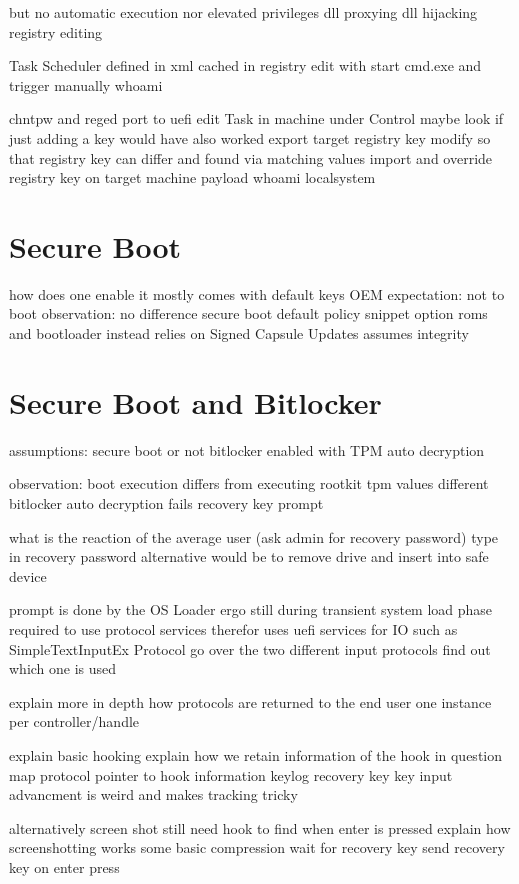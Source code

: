 but no automatic execution nor elevated privileges
dll proxying
dll hijacking
registry editing

Task Scheduler
defined in xml
cached in registry
edit with start cmd.exe and trigger manually
whoami

chntpw and reged
port to uefi
edit Task in machine under Control
maybe look if just adding a key would have also worked
export target registry key
modify so that registry key can differ and found via matching values
import and override registry key on target machine
payload whoami
localsystem


\section{Secure Boot}
how does one enable it
mostly comes with default keys OEM
expectation:
not to boot
observation:
no difference
secure boot default policy snippet
option roms and bootloader
instead relies on Signed Capsule Updates
assumes integrity


\section{Secure Boot and Bitlocker}
assumptions:
secure boot or not
bitlocker enabled with TPM auto decryption

observation:
boot execution differs from executing rootkit
tpm values different
bitlocker auto decryption fails
recovery key prompt

what is the reaction of the average user
(ask admin for recovery password)
type in recovery password
alternative would be to remove drive and insert into safe device

prompt is done by the OS Loader
ergo still during transient system load phase
required to use protocol services
therefor uses uefi services for IO
such as SimpleTextInputEx Protocol
go over the two different input protocols
find out which one is used

explain more in depth how protocols are returned to the end user
one instance per controller/handle

explain basic hooking
explain how we retain information of the hook in question
map protocol pointer to hook information
keylog recovery key
key input advancment is weird and makes tracking tricky

alternatively screen shot
still need hook to find when enter is pressed
explain how screenshotting works
some basic compression
wait for recovery key
send recovery key on enter press

